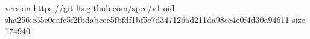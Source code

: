 version https://git-lfs.github.com/spec/v1
oid sha256:c55e0eafc5f2fbdabcec5fbfdf1bf5c7d347126ad211da98cc4e0f4d30a94611
size 174940
